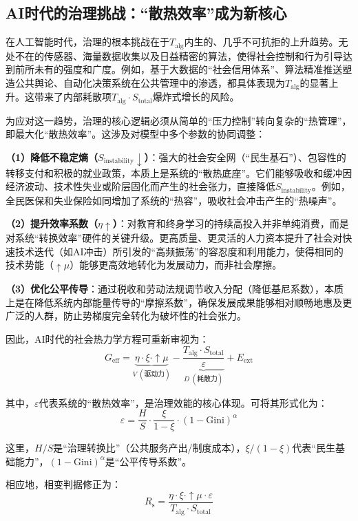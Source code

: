 \documentclass[twocolumn]{ctexart}
\newcommand{\upmu}{\uparrow\!\mu}
\newcommand{\upxi}{\xi}
\newcommand{\upeta}{\eta}
\newcommand{\Sinst}{S_{\mathrm{instability}}}
\newcommand{\Stot}{S_{\mathrm{total}}}
\newcommand{\Talg}{T_{\mathrm{alg}}}
\newcommand{\Geff}{G_{\mathrm{eff}}}
\newcommand{\Eext}{E_{\mathrm{ext}}}
\newcommand{\Rs}{R_{\mathrm{s}}}
\newcommand{\veps}{\varepsilon}
\begin{document}
\subsection{AI时代的治理挑战：“散热效率”成为新核心}

在人工智能时代，治理的根本挑战在于$\Talg$内生的、几乎不可抗拒的上升趋势。无处不在的传感器、海量数据收集以及日益精密的算法，使得社会控制和行为引导达到前所未有的强度和广度。例如，基于大数据的“社会信用体系”、算法精准推送塑造公共舆论、自动化决策系统在公共管理中的渗透，都具体表现为$\Talg$的显著上升。这带来了内部耗散项$\Talg\cdot\Stot$爆炸式增长的风险。

为应对这一趋势，治理的核心逻辑必须从简单的“压力控制”转向复杂的“热管理”，即最大化“散热效率”。这涉及对模型中多个参数的协同调整：

\textbf{（1）降低不稳定熵（$\Sinst\downarrow$）}：强大的社会安全网（“民生基石”）、包容性的转移支付和积极的就业政策，本质上是系统的“散热底座”。它们能够吸收和缓冲因经济波动、技术性失业或阶层固化而产生的社会张力，直接降低$\Sinst$。例如，全民医保和失业保险如同增加了系统的“热容”，吸收社会冲击产生的“热噪声”。

\textbf{（2）提升效率系数（$\upeta\uparrow$）}：对教育和终身学习的持续高投入并非单纯消费，而是对系统“转换效率”硬件的关键升级。更高质量、更灵活的人力资本提升了社会对快速技术迭代（如AI冲击）所引发的“高频振荡”的容忍度和利用能力，使得相同的技术势能（$\upmu$）能够更高效地转化为发展动力，而非社会摩擦。

\textbf{（3）优化公平传导}：通过税收和劳动法规调节收入分配（降低基尼系数），本质上是在降低系统内部能量传导的“摩擦系数”，确保发展成果能够相对顺畅地惠及更广泛的人群，防止势梯度完全转化为破坏性的社会张力。

因此，AI时代的社会热力学方程可重新审视为：
\begin{equation}\label{eq:AI_Geff}
\Geff = \underbrace{\upeta \cdot \upxi \cdot \upmu}_{V\;(\text{驱动力})} - \underbrace{\frac{\Talg \cdot \Stot}{\veps}}_{D\;(\text{耗散力})} + \Eext
\end{equation}

其中，$\veps$代表系统的“散热效率”，是治理效能的核心体现。可将其形式化为：
\begin{equation}\label{eq:epsilon}
\veps = \frac{H}{S} \cdot \frac{\upxi}{1-\upxi} \cdot (1-\text{Gini})^\alpha
\end{equation}

这里，$H/S$是“治理转换比”（公共服务产出/制度成本），$\upxi/(1-\upxi)$代表“民生基础能力”，$(1-\text{Gini})^\alpha$是“公平传导系数”。

相应地，相变判据修正为：
\begin{equation}\label{eq:Rs_AI}
\Rs = \frac{\upeta \cdot \upxi \cdot \upmu \cdot \veps}{\Talg \cdot \Stot}
\end{equation}
\end{document}
